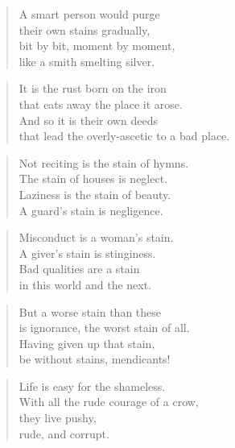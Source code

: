 \documentclass[12pt,openany]{book}%
\begin{document}
\begin{verse}%
A smart person would purge \\
their own stains gradually, \\
bit by bit, moment by moment, \\
like a smith smelting silver. 

%
\end{verse}

\begin{verse}%
It is the rust born on the iron \\
that eats away the place it arose. \\
And so it is their own deeds \\
that lead the overly-ascetic to a bad place. 

%
\end{verse}

\begin{verse}%
Not reciting is the stain of hymns. \\
The stain of houses is neglect. \\
Laziness is the stain of beauty. \\
A guard’s stain is negligence. 

%
\end{verse}

\begin{verse}%
Misconduct is a woman’s stain. \\
A giver’s stain is stinginess. \\
Bad qualities are a stain \\
in this world and the next. 

%
\end{verse}

\begin{verse}%
But a worse stain than these \\
is ignorance, the worst stain of all. \\
Having given up that stain, \\
be without stains, mendicants! 

%
\end{verse}

\begin{verse}%
Life is easy for the shameless. \\
With all the rude courage of a crow, \\
they live pushy, \\
rude, and corrupt. 

%
\end{verse}
\end{document}
